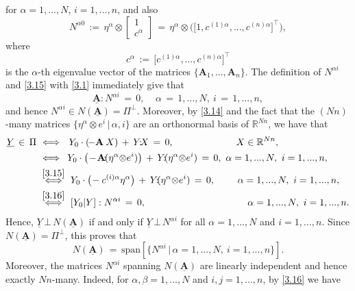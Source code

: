\documentclass{amsart}
\theoremstyle{definition}
\numberwithin{equation}{section}
\begin{document}
for ${\alpha}=1,...,N$, $i=1,...,n$, and also
\begin{equation}    \label{3.17}
N^{{\alpha} 0}\, :=\, \eta^{\alpha} {\otimes} 
\left[
\begin{array}{c}
1\\
\hline c^{\alpha}
\end{array}
\right]\, =\, \eta^{\alpha} {\otimes} \Big(\big[1,c^{(1){\alpha}},...,c^{(n){\alpha}}\big]^\top\Big), 
\end{equation}
where
\[
c^{\alpha}\, :=\, \big[c^{(1){\alpha}},...,c^{(n){\alpha}}\big]^\top
\]
is the ${\alpha}$-th eigenvalue vector of the matrices $\{{\textbf{A}}_1,...,{\textbf{A}}_n\}$. The definition of $N^{{\alpha} i}$ and \eqref{3.15} with \eqref{3.1} immediately give that
\[
{\underline{\textbf{A}}} : N^{{\alpha} i}\, =\, 0, \ \ \ \ \ {\alpha}\,=\,1,...,N,\ i\,=\,1,...,n,
\]
and hence $N^{{\alpha} i} \in N({\underline{\textbf{A}}})=\Pi^\bot$. Moreover, by \eqref{3.14} and the fact that the $(Nn)$-many matrices $\{\eta^{\alpha} {\otimes} e^i \,| \, {\alpha},i\}$ are an orthonormal basis of ${\mathbb{R}}^{Nn}$, we have that
\[
\begin{split}
\underline{Y} \,  \in \, \Pi \   &\Longleftrightarrow \ \  Y_0 \cdot(\!-{\textbf{A}}\:X) \, +\, Y{\!:\!} X\,=\,0,\hspace{65pt}   X\in {\mathbb{R}}^{Nn}, \\
&\Longleftrightarrow \  \,  Y_0 \cdot\big(\!- \! {\textbf{A}}{\!:\!} (\eta^{\alpha} {\otimes} e^i)\big) \, +\, Y{\!:\!}(\eta^{\alpha} {\otimes} e^i)\,=\,0,\  {\alpha}=1,...,N,\ i=1,...,n,\\
&\overset{ \eqref{3.15} }{\Longleftrightarrow}  \   Y_0 \cdot\big( \!-c^{(i){\alpha}}\eta^{\alpha}\big) \, +\, Y{\!:\!}(\eta^{\alpha} {\otimes} e^i)\,=\,0,\ \ \ \ \ \ \  {\alpha}=1,...,N,\ i=1,...,n,\\
&\overset{ \eqref{3.16} }{\Longleftrightarrow}  \    [Y_0|Y] : N^{{\alpha} i}\,=\,0,\hspace{106pt}  {\alpha}=1,...,N,\ i=1,...,n.
\end{split}
\]
Hence, $\underline{Y} \, \bot\, N({\underline{\textbf{A}}})$ if and only if $\underline{Y} \, \bot\, N^{{\alpha} i}$ for all ${\alpha}=1,...,N$ and $i=1,...,n$. Since $N({\underline{\textbf{A}}})=\Pi^\bot$, this proves that
\begin{equation}   \label{3.18}
N({\underline{\textbf{A}}})\, =\, {\textrm{span}}[\Big\{ N^{{\alpha} i}\, \big|\, {\alpha}=1,...,N,\ i=1,...,n\Big\}].
\end{equation}
Moreover, the matrices $N^{{\alpha} i}$ spanning $N({\underline{\textbf{A}}})$ are linearly independent and hence exactly $Nn$-many. Indeed, for ${\alpha},{\beta}=1,...,N$ and $i,j=1,...,n$, by \eqref{3.16} we have
\end{document}

